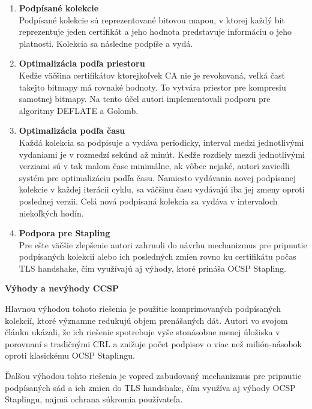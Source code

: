 \documentclass[12pt, twoside]{book}
\newcommand{\subsubsubsection}[1]{%
  \vspace{0.2em}  
  \textbf{#1} \\[0.2em]
  \hspace*{\parindent}
}
\begin{document}
\begin{enumerate} 
\item \textbf{Podpísané kolekcie} \\
Podpísané kolekcie sú reprezentované bitovou mapou, v ktorej každý bit reprezentuje jeden certifikát a jeho hodnota predstavuje informáciu o jeho platnosti. Kolekcia sa následne podpíše a vydá.\cite{ccsp}


\item \textbf{Optimalizácia podľa priestoru} \\
Keďže väčšina certifikátov ktorejkoľvek CA nie je revokovaná,\cite{ccsp} veľká časť takejto bitmapy má rovnaké hodnoty. To vytvára priestor pre kompresiu samotnej bitmapy. Na tento účel autori implementovali podporu pre algoritmy DEFLATE a Golomb.\cite{ccsp}

\item \textbf{Optimalizácia podľa času} \\
Každá kolekcia sa podpisuje a vydáva periodicky, interval medzi jednotlivými vydaniami je v rozmedzí sekúnd až minút. Keďže rozdiely mezdi jednotlivými verziami sú v tak malom čase minimálne, ak vôbec nejaké, autori zaviedli systém pre optimalizáciu podľa času. Namiesto vydávania novej podpísanej kolekcie v každej iterácii cyklu,  sa väčšinu času vydávajú iba jej zmeny oproti poslednej verzii. Celá nová podpísaná kolekcia sa vydáva v intervaloch niekoľkých hodín.\cite{ccsp}

\item \textbf{Podpora pre Stapling} \\
Pre ešte väčšie zlepšenie autori zahrnuli do návrhu mechanizmus pre pripnutie podpísaných kolekcií alebo ich posledných zmien rovno ku certifikátu počas TLS handshake, čím využívajú aj výhody, ktoré prináša OCSP Stapling.\cite{ccsp}
\end{enumerate}

\subsubsubsection{Výhody a nevýhody CCSP}
Hlavnou výhodou tohoto riešenia je použitie komprimovaných podpísaných kolekcií, ktoré významne redukujú objem prenášaných dát. Autori vo svojom článku ukázali, že     ich riešenie spotrebuje vyše stonásobne menej úložiska v porovnaní s tradičnými CRL a znižuje počet podpisov o viac než milión-násobok oproti klasickému OCSP Staplingu. \cite{ccsp}

Ďalšou výhodou tohto riešenia je vopred zabudovaný mechanizmus pre pripnutie podpísaných sád a ich zmien do TLS handshake, čím využíva aj výhody OCSP Staplingu, najmä ochrana súkromia používateľa.\cite{ccsp}
\end{document}
